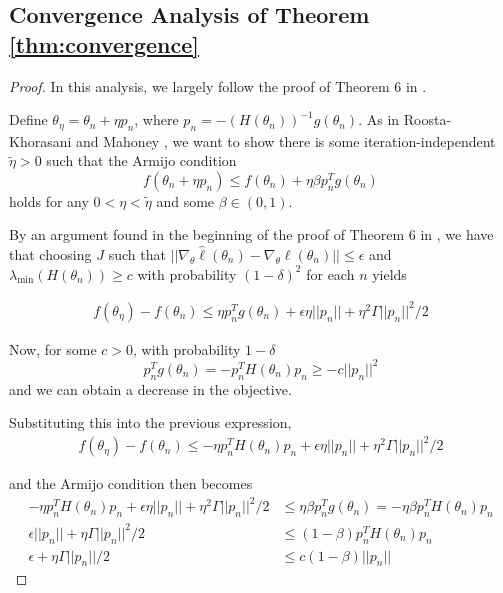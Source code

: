 \documentclass{article}
\begin{document}
\subsection{Convergence Analysis of Theorem \ref{thm:convergence}}

\begin{proof}

In this analysis, we largely follow the proof of Theorem 6 in \cite{mahoney2016subsampled}.

Define $\theta_\eta = \theta_n + \eta p_n$, where $p_n=-(H(\theta_n))^{-1}g(\theta_n)$. As in Roosta-Khorasani and Mahoney \cite{mahoney2016subsampled}, we want to show there is some iteration-independent $\tilde{\eta}>0$ such that the Armijo condition
\begin{equation}
    f(\theta_n+\eta p_n) \leq f(\theta_n) + \eta\beta p_n^Tg(\theta_n)
\end{equation}
holds for any $0< \eta < \tilde{\eta}$ and some $\beta \in (0,1)$.

By an argument found in the beginning of the proof of Theorem 6 in \cite{mahoney2016subsampled}, we have that choosing $J$ such that $||\nabla_\theta\hat{\ell}(\theta_n) - \nabla_\theta \ell(\theta_n)|| \leq \epsilon$ and $\lambda_{\min}(H(\theta_n)) \geq c$ with probability $(1-\delta)^2$ for each $n$ yields

\begin{align}
    f(\theta_\eta)-f(\theta_n) \leq \eta p_n^Tg(\theta_n) + \epsilon\eta||p_n|| + \eta^2 \Gamma ||p_n||^2 / 2
\end{align}

Now, for some $c>0$, with probability $1-\delta$
\begin{equation}
    p_n^Tg(\theta_n) = -p_n^TH(\theta_n)p_n \geq -c||p_n||^2
\end{equation}
and we can obtain a decrease in the objective. 

Substituting this into the previous expression,
\begin{align}
    f(\theta_\eta)-f(\theta_n) \leq -\eta p_n^TH(\theta_n)p_n + \epsilon\eta||p_n|| + \eta^2 \Gamma ||p_n||^2 / 2
\end{align}

and the Armijo condition then becomes
\begin{align}
    -\eta p_n^TH(\theta_n)p_n + \epsilon\eta||p_n|| + \eta^2 \Gamma ||p_n||^2 / 2 &\leq \eta \beta p_n^Tg(\theta_n) = - \eta \beta p_n^TH(\theta_n)p_n \\
    \epsilon||p_n|| + \eta \Gamma ||p_n||^2 / 2 &\leq (1- \beta) p_n^TH(\theta_n)p_n \\
    \epsilon + \eta \Gamma ||p_n|| / 2 &\leq c(1- \beta) ||p_n||
\end{align}


\end{proof}
\end{document}
